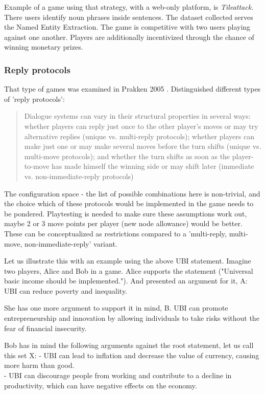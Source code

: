 \documentclass{report}
\begin{document}
Example of a game using that strategy, with a web-only platform, is  \textit{Tileattack}. There users identify noun phrases inside sentences. The dataset collected serves the Named Entity Extraction. The game is competitive with two users playing against one another. Players are additionally incentivized through the chance of winning monetary prizes.
\cite{noauthor_tileattack_nodate}

\subsubsection{Reply protocols}
That type of games was examined in Prakken 2005 \cite{prakken_coherence_2005}. Distinguished different types of 'reply protocols':
\begin{quotation}
  Dialogue systems can vary in their structural properties
in several ways: whether players can reply just once to the other player’s moves or may try
alternative replies (unique vs. multi-reply protocols); whether players can make just one or may
make several moves before the turn shifts (unique vs. multi-move protocols); and whether the turn
shifts as soon as the player-to-move has made himself the winning side or may shift later (immediate
vs. non-immediate-reply protocols)
\end{quotation}
\cite[page 1010]{prakken_coherence_2005}

The configuration space - the list of possible combinations here is non-trivial, and the choice which of these protocols would be implemented in the game needs to be pondered.
Playtesting is needed to make sure these assumptions work out, maybe 2 or 3 move points per player (new node allowance) would be better.
These can be conceptualized as restrictions compared to a 'multi-reply, multi-move, non-immediate-reply' variant.

Let us illustrate this with an example using the above UBI statement. Imagine two players, Alice and Bob in a game.
Alice supports the statement ("Universal basic income should be implemented."). And presented an argument for it, A:
UBI can reduce poverty and inequality.

She has one more argument to support it in mind, B.
UBI can promote entrepreneurship and innovation by allowing individuals to take risks without the fear of financial insecurity.

Bob has in mind the following arguments against the root statement, let us call this set X:
- UBI can lead to inflation and decrease the value of currency, causing more harm than good. \\
- UBI can discourage people from working and contribute to a decline in productivity, which can have  negative effects on the economy.\\
\end{document}
